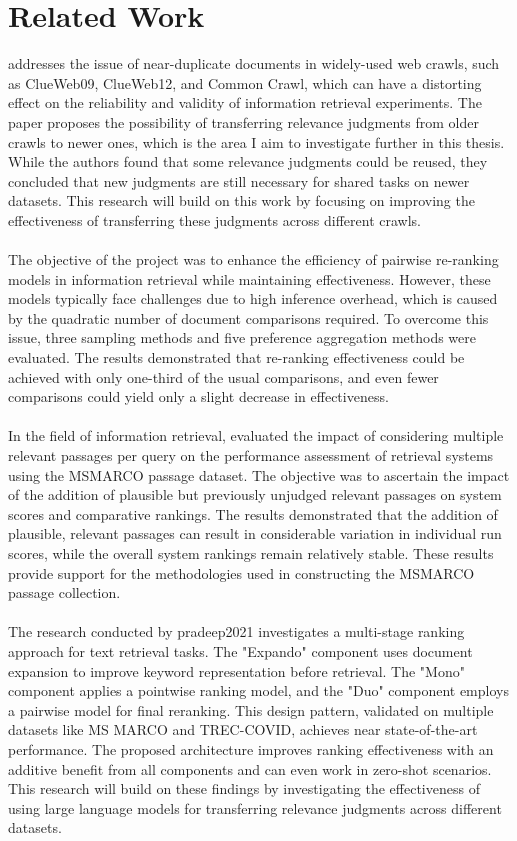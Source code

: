 \chapter{Related Work}\label{related-work}

\cite{froebe:2021} addresses the issue of near-duplicate documents in widely-used web crawls, such as ClueWeb09, ClueWeb12, and Common Crawl, which can have a distorting effect on the reliability and validity of information retrieval experiments. The paper proposes the possibility of transferring relevance judgments from older crawls to newer ones, which is the area I aim to investigate further in this thesis. While the authors found that some relevance judgments could be reused, they concluded that new judgments are still necessary for shared tasks on newer datasets. This research will build on this work by focusing on improving the effectiveness of transferring these judgments across different crawls.
\\\\
The objective of the \citet{gienapp:2022} project was to enhance the efficiency of pairwise re-ranking models in information retrieval while maintaining effectiveness. However, these models typically face challenges due to high inference overhead, which is caused by the quadratic number of document comparisons required. To overcome this issue, three sampling methods and five preference aggregation methods were evaluated. The results demonstrated that re-ranking effectiveness could be achieved with only one-third of the usual comparisons, and even fewer comparisons could yield only a slight decrease in effectiveness.
\\\\
In the field of information retrieval, \citet{mackenzie:2021} evaluated the impact of considering multiple relevant passages per query on the performance assessment of retrieval systems using the MSMARCO passage dataset. The objective was to ascertain the impact of the addition of plausible but previously unjudged relevant passages on system scores and comparative rankings. The results demonstrated that the addition of plausible, relevant passages can result in considerable variation in individual run scores, while the overall system rankings remain relatively stable. These results provide support for the methodologies used in constructing the MSMARCO passage collection.
\\\\
The research conducted by pradeep2021 investigates a multi-stage ranking approach for text retrieval tasks. The "Expando" component uses document expansion to improve keyword representation before retrieval. The "Mono" component applies a pointwise ranking model, and the "Duo" component employs a pairwise model for final reranking. This design pattern, validated on multiple datasets like MS MARCO and TREC-COVID, achieves near state-of-the-art performance. The proposed architecture improves ranking effectiveness with an additive benefit from all components and can even work in zero-shot scenarios. This research will build on these findings by investigating the effectiveness of using large language models for transferring relevance judgments across different datasets.
